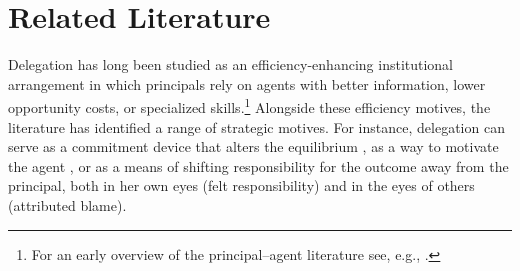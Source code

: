 \section{Related Literature} \label{literature}


Delegation has long been studied as an efficiency-enhancing institutional arrangement in which principals rely on agents with better information, lower opportunity costs, or specialized skills.\footnote{For an early overview of the principal--agent literature see, e.g., \citet{bolton_contract_2005}.} Alongside these efficiency motives, the literature has identified a range of strategic motives. For instance, delegation can serve as a commitment device that alters the equilibrium \citep{schelling_strategy_1960, fershtman_gneezy_2001}, as a way to motivate the agent \citep{aghion_formal_1997}, or as a means of shifting responsibility for the outcome away from the principal, both in her own eyes (felt responsibility) and in the eyes of others (attributed blame).

